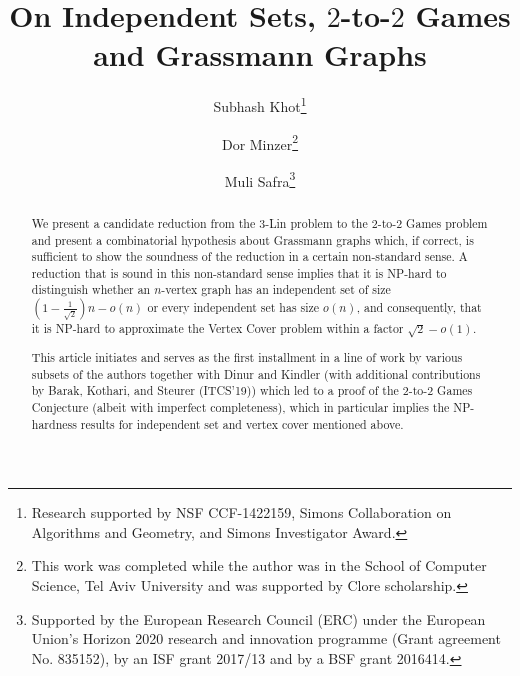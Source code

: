 \documentclass{toc}
\begin{document}
\begin{frontmatter}%

%
%
%

%
%
\title{On Independent Sets, $2$-to-$2$ Games and Grassmann
  Graphs
}  %

%
%

%
%
%
%
%
%

%
%
%
%
%
%
%
%
%
%
%
%


%
%
%
%

%

\author[khot]{Subhash Khot\thanks{Research
supported by NSF CCF-1422159, Simons Collaboration on Algorithms and Geometry, and Simons Investigator Award.}}
\author[minzer]{Dor Minzer\thanks{This work was completed while the author was in the School of Computer Science, Tel Aviv University
and was supported by Clore scholarship.}}
\author[safra]{Muli Safra\thanks{Supported by the European Research Council (ERC) under the European Union’s Horizon 2020 research and innovation programme (Grant agreement No. 835152),
by an ISF grant 2017/13 and by a BSF grant 2016414.}}

%
%
%
%

%
%
%
%
%
%
%
%
\begin{abstract}
  We present a candidate reduction from the  $3$-Lin problem to the $2$-to-$2$ Games problem and present a combinatorial hypothesis about
Grassmann graphs which, if correct, is sufficient to show the soundness of the reduction in
a certain non-standard sense. A reduction that is sound in this non-standard sense
implies that it is NP-hard to distinguish whether an $n$-vertex graph has an independent
set of size $\left( 1- \frac{1}{\sqrt{2}} \right) n - o(n) $ or
%
every  independent set has size $o(n)$, and consequently, that it is NP-hard
to approximate the  Vertex Cover problem within a factor $\sqrt{2}-o(1)$.

This %
article %
initiates and serves as the first installment in a line of work
%
%
%
%
by various subsets of the authors together with Dinur and Kindler
(with additional contributions by Barak, Kothari, and Steurer (ITCS'19)) %
which led to a proof of the $2$-to-$2$ Games Conjecture (albeit with imperfect
completeness), which in %
particular  %
implies the NP-hardness results for independent set
and vertex cover mentioned above.
\end{abstract}

%

\end{frontmatter}
\end{document}
